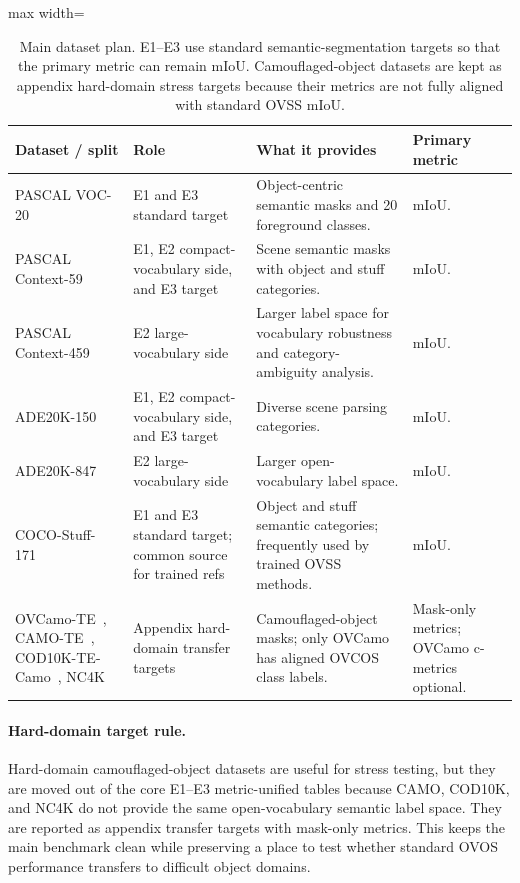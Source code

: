 \documentclass[11pt,a4paper]{article}
\begin{document}
\begin{table}[!htbp]
\centering
\scriptsize
\caption{Main dataset plan. E1--E3 use standard semantic-segmentation targets so that the primary metric can remain mIoU. Camouflaged-object datasets are kept as appendix hard-domain stress targets because their metrics are not fully aligned with standard OVSS mIoU.}
\label{tab:datasets}
\setlength{\tabcolsep}{3pt}
\begin{adjustbox}{max width=\textwidth}
\begin{tabular}{p{} p{} p{} p{}}
\toprule
Dataset / split & Role & What it provides & Primary metric \\
\midrule
PASCAL VOC-20~\cite{pascalvoc2010} & E1 and E3 standard target & Object-centric semantic masks and 20 foreground classes. & mIoU. \\
PASCAL Context-59~\cite{pascalcontext2014} & E1, E2 compact-vocabulary side, and E3 target & Scene semantic masks with object and stuff categories. & mIoU. \\
PASCAL Context-459~\cite{pascalcontext2014} & E2 large-vocabulary side & Larger label space for vocabulary robustness and category-ambiguity analysis. & mIoU. \\
ADE20K-150~\cite{ade20k2017} & E1, E2 compact-vocabulary side, and E3 target & Diverse scene parsing categories. & mIoU. \\
ADE20K-847~\cite{ade20k2017} & E2 large-vocabulary side & Larger open-vocabulary label space. & mIoU. \\
COCO-Stuff-171~\cite{cocostuff2018} & E1 and E3 standard target; common source for trained refs & Object and stuff semantic categories; frequently used by trained OVSS methods. & mIoU. \\
\midrule
OVCamo-TE~\cite{ovcoser2024}, CAMO-TE~\cite{camo2019}, COD10K-TE-Camo~\cite{cod10k2020}, NC4K~\cite{nc4k2021} & Appendix hard-domain transfer targets & Camouflaged-object masks; only OVCamo has aligned OVCOS class labels. & Mask-only metrics; OVCamo c-metrics optional. \\
\bottomrule
\end{tabular}
\end{adjustbox}
\end{table}

\paragraph{Hard-domain target rule.}
Hard-domain camouflaged-object datasets are useful for stress testing, but they are moved out of the core E1--E3 metric-unified tables because CAMO, COD10K, and NC4K do not provide the same open-vocabulary semantic label space. They are reported as appendix transfer targets with mask-only metrics. This keeps the main benchmark clean while preserving a place to test whether standard OVOS performance transfers to difficult object domains.
\end{document}
